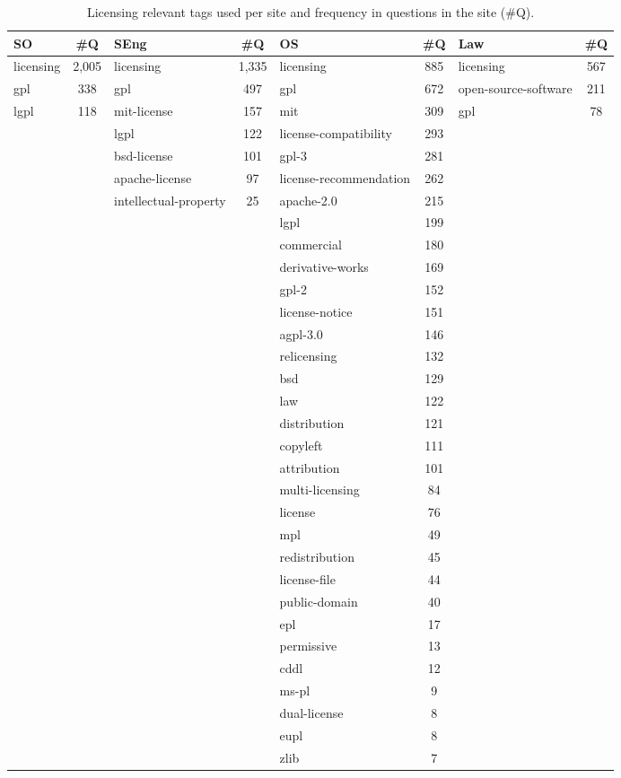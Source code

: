 \begin{table}
\centering
  \caption{Licensing relevant tags used per site and frequency in questions in the site (\#Q).}
  \label{tab:collection-tags}
\begin{adjustbox}{width=0.9\textwidth}
  \begin{tabular}{lclclclc}
    \hline
    \textbf{SO} & \textbf{\#Q} & \textbf{SEng} & \textbf{\#Q} & \textbf{OS} & \textbf{\#Q} & \textbf{Law} & \textbf{\#Q}\\
    \hline
licensing &	2,005&	licensing&	1,335&	licensing&	885	&licensing&	567\\
gpl	&338&	gpl	&497&	gpl&	672	&open-source-software&	211\\
lgpl	&118&	mit-license&	157&	mit&	309&	gpl	&78\\
&&lgpl&	122&	license-compatibility&	293\\
&&bsd-license &	101&	gpl-3&	281\\
&&apache-license&	97&	license-recommendation&	262\\
&&intellectual-property&25&apache-2.0&215\\
&&&&lgpl&	199\\
&&&&commercial&	180\\
&&&&derivative-works&	169\\
&&&&gpl-2&	152\\
&&&&license-notice&	151\\
&&&&agpl-3.0&	146\\
&&&&relicensing	&132\\
&&&&bsd&	129\\
&&&&law	&122\\
&&&&distribution&	121\\
&&&&copyleft&	111\\
&&&&attribution	&101\\
&&&&multi-licensing&	84\\
&&&&license	&76\\
&&&&mpl	&49\\
&&&&redistribution&	45\\
&&&&license-file&	44\\
&&&&public-domain&	40\\
&&&&epl	&17\\
&&&&permissive	&13\\
&&&&cddl&	12\\
&&&&ms-pl&	9\\
&&&&dual-license&	8\\
&&&&eupl&	8\\
&&&&zlib&	7\\

\end{tabular}
\end{adjustbox}
\end{table}
